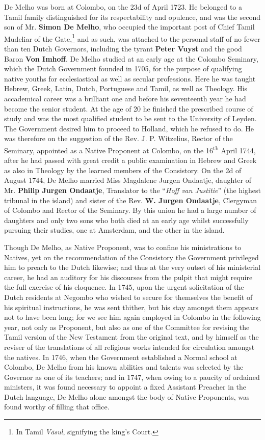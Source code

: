 \documentclass{article}
\begin{document}
De Melho was born at Colombo, on the 23d of April 1723. He belonged to a Tamil family distinguished for its respectability and opulence, and was the second son of Mr. \textbf{Simon De Melho}, who occupied the important post of Chief Tamil Mudeliar of the Gate,\footnote{In Tamil \emph{V\={a}sul}, signifying the king's Court.} and as such, was attached to the personal staff of no fewer than ten Dutch Governors, including the tyrant \textbf{Peter Vuyst} and the good Baron \textbf{Von Imhoff}. De Melho studied at an early age at the Colombo Seminary, which the Dutch Government founded in 1705, for the purpose of qualifying native youths for ecclesiastical as well as secular professions. Here he was taught Hebrew, Greek, Latin, Dutch, Portuguese and Tamil, as well as Theology. His accademical career was a brilliant one and before his seventeenth year he had become the senior student. At the age of 20 he finished the prescribed course of study and was the most qualified student to be sent to the University of Leyden. The Government desired him to proceed to Holland, which he refused to do. He was therefore on the suggestion of the Rev. J. P. Witzelius, Rector of the Seminary, appointed as a Native Proponent at Colombo, on the 16\textsuperscript{th} April 1744, after he had passed with great credit a public examination in Hebrew and Greek as also in Theology by the learned members of the Consistory. On the 2d of August 1744, De Melho married Miss Magdalene Jurgen Ondaatje, daughter of Mr. \textbf{Philip Jurgen Ondaatje}, Translator to the ``\emph{Hoff van Justitie}'' (the highest tribunal in the island) and sister of the Rev. \textbf{W. Jurgen Ondaatje}, Clergyman of Colombo and Rector of the Seminary. By this union he had a large number of daughters and only two sons who both died at an early age whilst successfully pursuing their studies, one at Amsterdam, and the other in the island.

Though De Melho, as Native Proponent, was to confine his ministrations to Natives, yet on the recommendation of the Consistory the Government privileged him to preach to the Dutch likewise; and thus at the very outset of his ministerial career, he had an auditory for his discourses from the pulpit that might require the full exercise of his eloquence. In 1745, upon the urgent solicitation of the Dutch residents at Negombo who wished to secure for themselves the benefit of his spiritual instructions, he was sent thither, but his stay amongst them appears not to have been long; for we see him again employed in Colombo in the following year, not only as Proponent, but also as one of the Committee for revising the Tamil version of the New Testament from the original text, and by himself as the reviser of the translations of all religious works intended for circulation amongst the natives. In 1746, when the Government established a Normal school at Colombo, De Melho from his known abilities and talents was selected by the Governor as one of its teachers; and in 1747, when owing to a paucity of ordained ministers, it was found necessary to appoint a fixed Assistant Preacher in the Dutch language, De Melho alone amongst the body of Native Proponents, was found worthy of filling that office.
\end{document}
